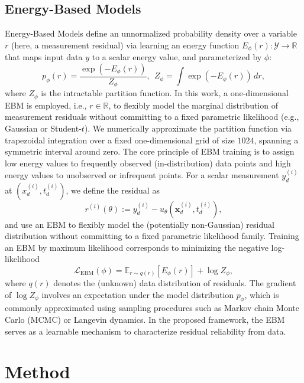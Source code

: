 \documentclass{article}
\theoremstyle{plain}
\theoremstyle{definition}
\theoremstyle{remark}
\begin{document}
\subsection{Energy-Based Models}
Energy-Based Models define an unnormalized probability density over a variable $r$ (here, a measurement residual) via learning an energy function $E_\phi(r): \mathcal{Y} \rightarrow \mathbb{R}$ that maps input data $y$ to a scalar energy value, and parameterized by $\phi$:
\begin{equation}
p_\phi(r) = \frac{\exp(-E_\phi(r))}{Z_\phi}, \ \
Z_\phi = \int \exp(-E_\phi(r))\,dr,
\label{eq:ebm_density}
\end{equation}
where $Z_\phi$ is the intractable partition function. In this work, a one-dimensional EBM is employed, i.e., $r\in\mathbb{R}$, to flexibly model the marginal distribution of measurement residuals without committing to a fixed parametric likelihood (e.g., Gaussian or Student-$t$). We numerically approximate the partition function via trapezoidal integration over a fixed one-dimensional grid of size $1024$, spanning a symmetric interval around zero. The core principle of EBM training is to assign low energy values to frequently observed (in-distribution) data points and high energy values to unobserved or infrequent points. For a scalar measurement $y_d^{(i)}$ at $(x_d^{(i)},t_d^{(i)})$, we define the residual as
\begin{equation}
r^{(i)}(\theta) := y_d^{(i)} - \hat{u}_\theta(\mathbf{x}_d^{(i)},t_d^{(i)}),
\label{eq:residual_def}
\end{equation}
and use an EBM to flexibly model the (potentially non-Gaussian) residual distribution without committing to a fixed parametric likelihood family. Training an EBM by maximum likelihood corresponds to minimizing the negative log-likelihood
\begin{equation}
\mathcal{L}_{\text{EBM}}(\phi)
= \mathbb{E}_{r \sim q(r)}\!\left[E_\phi(r)\right] + \log Z_\phi,
\label{eq:ebm_nll}
\end{equation}
where $q(r)$ denotes the (unknown) data distribution of residuals. The gradient of $\log Z_\phi$ involves an expectation under the model distribution $p_\phi$, which is commonly approximated using sampling procedures such as Markov chain Monte Carlo (MCMC) or Langevin dynamics. In the proposed framework, the EBM serves as a learnable mechanism to characterize residual reliability from data.

\section{Method}
\label{sec:method}
\end{document}
